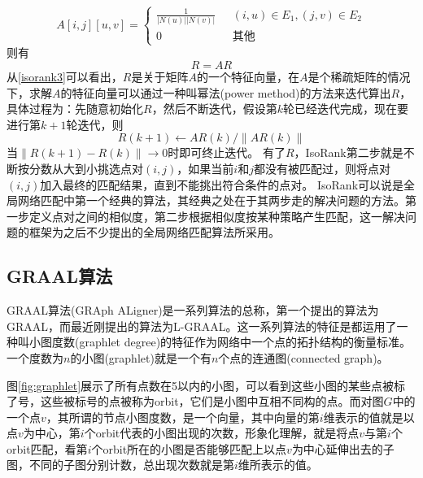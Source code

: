 \begin{equation}\label{isorank2}
A[i,j][u,v]=\begin{cases}
\frac{1}{\left | N(u) \right |\left | N(v) \right |} & \text{  } (i,u)\in E_1, (j,v)\in E_2 \\ 
 0& \text{  } \text{其他}
\end{cases}
\end{equation}
则有
\begin{equation}\label{isorank3}
R=AR
\end{equation}
从\ref{isorank3}可以看出，$R$是关于矩阵$A$的一个特征向量，在$A$是个稀疏矩阵的情况下，求解$A$的特征向量可以通过一种叫幂法(power method)的方法来迭代算出$R$，具体过程为：先随意初始化$R$，然后不断迭代，假设第$k$轮已经迭代完成，现在要进行第$k+1$轮迭代，则
\begin{equation}\label{isorank3}
R(k+1)\leftarrow AR(k)/\left \|AR(k)\right \|
\end{equation}
当$\left \|R(k+1)-R(k)\right \|\rightarrow 0$时即可终止迭代。
有了$R$，IsoRank第二步就是不断按分数从大到小挑选点对$(i,j)$，如果当前$i$和$j$都没有被匹配过，则将点对$(i,j)$加入最终的匹配结果，直到不能挑出符合条件的点对。
IsoRank可以说是全局网络匹配中第一个经典的算法，其经典之处在于其两步走的解决问题的方法。第一步定义点对之间的相似度，第二步根据相似度按某种策略产生匹配，这一解决问题的框架为之后不少提出的全局网络匹配算法所采用。
\subsection{GRAAL算法}
GRAAL算法(GRAph ALigner)是一系列算法的总称，第一个提出的算法为GRAAL\cite{kuchaiev2010topological}，而最近刚提出的算法为L-GRAAL\cite{malod2015graal}。这一系列算法的特征是都运用了一种叫小图度数(graphlet degree)的特征作为网络中一个点的拓扑结构的衡量标准。一个度数为$n$的小图(graphlet)就是一个有$n$个点的连通图(connected graph)。

图\ref{fig:graphlet}展示了所有点数在5以内的小图，可以看到这些小图的某些点被标了号，这些被标号的点被称为orbit，它们是小图中互相不同构的点。而对图$G$中的一个点$v$，其所谓的节点小图度数，是一个向量，其中向量的第$i$维表示的值就是以点$v$为中心，第$i$个orbit代表的小图出现的次数，形象化理解，就是将点$v$与第$i$个orbit匹配，看第$i$个orbit所在的小图是否能够匹配上以点$v$为中心延伸出去的子图，不同的子图分别计数，总出现次数就是第$i$维所表示的值。


